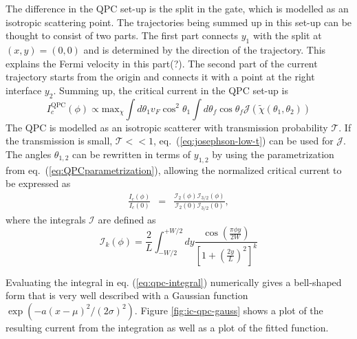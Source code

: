 The difference in the QPC set-up is the split in the gate, which is modelled as an isotropic scattering point. The trajectories being summed up in this set-up can be thought to consist of two parts. The first part connects $y_1$ with the split at $(x, y) = (0, 0)$ and is determined by the direction of the trajectory. This explains the Fermi velocity in this part(?). The second part of the current trajectory starts from the origin and connects it with a point at the right interface $y_2$. Summing up, the  critical current in the QPC set-up is
\begin{equation}
I_c^{\text{QPC}}(\phi) \propto \text{max}_{\chi} \int d \theta_1 v_F \cos^2 \theta_1 \int d \theta_f \cos \theta_f \mathcal{J}\left( \tilde{\chi} (\theta_1, \theta_2) \right)
\end{equation}
The QPC is modelled as an isotropic scatterer with transmission probability $\mathcal{T}$. If the transmission is small, $\mathcal{T} << 1$, eq.~(\ref{eq:josephson-low-t}) can be used for $\mathcal{J}$.
The angles $\theta_{1, 2}$ can be rewritten in terms of $y_{1, 2}$ by using the parametrization from eq.~(\ref{eq:QPCparametrization}), allowing the normalized critical current to be expressed as
\begin{eqnarray}
\frac{I_c(\phi)}{I_c(0)} &=& \frac{\mathcal{I}_2(\phi)\mathcal{I}_{3/2}(\phi)}{\mathcal{I}_2(0)\mathcal{I}_{3/2}(0)}\label{eq:qpc-integral},
\end{eqnarray}
where the integrals $\mathcal{I}$ are defined as
\begin{equation}
\mathcal{I}_k(\phi) = \frac{2}{L}\int_{-W/2}^{+W/2}dy \frac{\cos\left(\frac{\pi\phi y}{2W}\right)}{\left[1 + \left(\frac{2y}{L}\right)^2 \right]^k}
\label{integral-qpc}
\end{equation}

Evaluating the integral in eq. (\ref{eq:qpc-integral}) numerically gives a bell-shaped form that is very well described with a Gaussian function $\exp ( -a (x-\mu)^2 / (2 \sigma)^2 )$. Figure \ref{fig:ic-qpc-gauss} shows a plot of the resulting current from the integration as well as a plot of the fitted function. 


